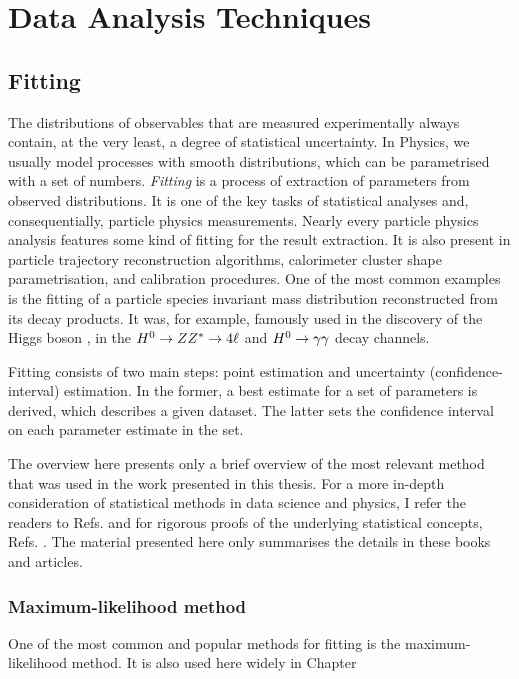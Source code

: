 \chapter{Data Analysis Techniques}

\section{Fitting}

The distributions of observables that are measured experimentally always contain, at the very least, a degree of statistical uncertainty.
In Physics, we usually model processes with smooth distributions, which can be parametrised with a set of numbers. 
\textit{Fitting} is a process of extraction of parameters from observed distributions. 
It is one of the key tasks of statistical analyses and, consequentially, particle physics measurements. 
Nearly every particle physics analysis features some kind of fitting for the result extraction. 
It is also present in particle trajectory reconstruction algorithms, calorimeter cluster shape parametrisation, and calibration procedures.
One of the most common examples is the fitting of a particle species invariant mass distribution reconstructed from its decay products.
It was, for example, famously used in the discovery of the Higgs boson \cite{ATLAS:2012yve,CMS:2012qbp}, in the  $H^0\rightarrow ZZ^{*}\rightarrow 4\ell$ and $H^0\rightarrow\gamma\gamma$ decay channels.

Fitting consists of two main steps: point estimation and uncertainty (confidence-interval) estimation. 
In the former, a best estimate for a set of parameters is derived, which describes a given dataset.
The latter sets the confidence interval on each parameter estimate in the set. 

The overview here presents only a brief overview of the most relevant method that was used in the work presented in this thesis. 
For a more in-depth consideration of statistical methods in data science and physics, I refer the readers to Refs. \cite{Behnke:2013pga,Blobel_Lohrmann_1998} and for rigorous proofs of the underlying statistical concepts, Refs. \cite{Bohm:2014vmk,James_2006,Barlow:1990vc}. 
The material presented here only summarises the details in these books and articles.
\subsection{Maximum-likelihood method}\label{sec:mle}

One of the most common and popular methods for fitting is the maximum-likelihood method. It is also used here widely in Chapter 


